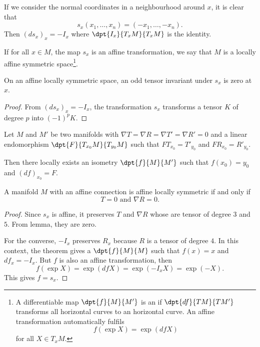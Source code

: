 If we consider the normal coordinates in a neighbourhood around $x$, it is clear that
\[
s_x(x_1,\ldots,x_n)=(-x_1,\ldots,-x_n).
\]
 Then $(ds_x)_x=-I_x$ where $\dpt{I_x}{T_xM}{T_xM}$ is the identity.

If for all $x\in M$, the map $s_x$ is an affine transformation, we say that $M$ is a locally affine symmetric space\footnote{A differentiable map $\dpt{f}{M}{M'}$ is an  if $\dpt{df}{TM}{TM'}$ transforms all horizontal curves to an horizontal curve. An affine transformation automatically fulfils
\[
  f(\exp X)=\exp(df X)
\]
for all $X\in T_xM$.}.


\begin{lemma}
On an affine locally symmetric space, an odd tensor invariant under $s_x$ is zero at $x$.
\end{lemma}

\begin{proof}
From $(ds_x)_x=-I_x$, the transformation $s_x$ transforms a tensor $K$ of degree $p$ into $(-1)^p K$.
\end{proof}


\begin{theorem}
Let $M$ and $M'$ be two manifolds with $\nabla T=\nabla R=\nabla T'=\nabla R'=0$ and a linear endomorphism $\dpt{F}{T_{x_0}M}{T_{y_0}M}$  such that $FT_{x_0}=T'_{y_0}$ and $FR_{x_0}=R'_{y_0}$.

Then there locally exists an isometry $\dpt{f}{M}{M'}$ such that $f(x_0)=y_0$ and $(df)_{x_0}=F$.
\end{theorem}

\begin{proposition}
A manifold $M$ with an affine connection is affine locally symmetric if and only if
\[
  T=0\text{ and }\nabla R=0.
\]
\end{proposition}


\begin{proof}
Since $s_x$ is affine, it preserves $T$ and $\nabla R$ whose are tensor of degree $3$ and $5$. From lemma, they are zero.

For the converse, $-I_x$ preserves $R_x$ because $R$ is a tensor of degree $4$. In this context, the theorem gives a $\dpt{f}{M}{M}$ such that $f(x)=x$ and $df_x=-I_x$. But $f$ is also an affine transformation, then
\begin{equation}
  f(\exp X)=\exp(df X)
           =\exp(-I_x X)
           =\exp(-X).
\end{equation}
This gives $f=s_x$.
\end{proof}

